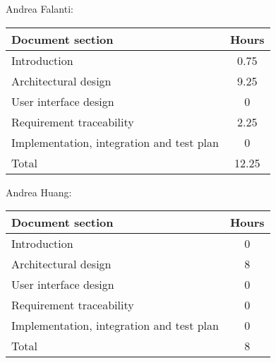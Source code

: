 Andrea Falanti:

\begin{tabular}{|l|c|}
    \hline
    Document section & Hours \\
    \hline
     Introduction & 0.75\\
     Architectural design & 9.25\\
     User interface design & 0\\
     Requirement traceability & 2.25\\
     Implementation, integration and test plan & 0\\
     \hline
     Total & 12.25\\
     \hline
\end{tabular}
\vskip 0.3in

Andrea Huang:

\begin{tabular}{|l|c|}
    \hline
    Document section & Hours \\
    \hline
     Introduction & 0\\
     Architectural design & 8\\
     User interface design & 0\\
     Requirement traceability & 0\\
     Implementation, integration and test plan & 0\\
     \hline
     Total & 8\\
     \hline
\end{tabular}